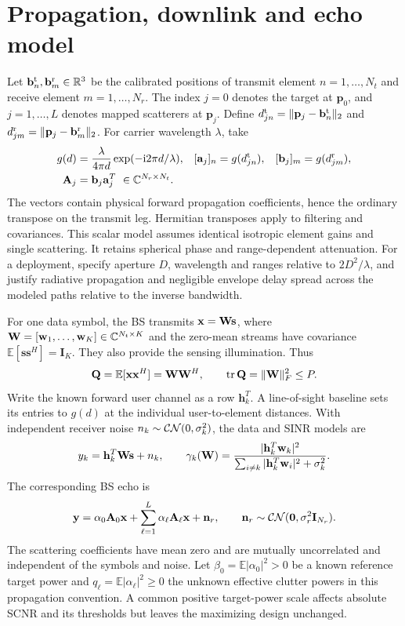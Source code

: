 \section{Propagation, downlink and echo model}
Let $\mathbf b_n^{\rm t},\mathbf b_m^{\rm r}\in\mathbb R^3$ be the calibrated positions of transmit element $n=1,\ldots,N_t$ and receive element $m=1,\ldots,N_r$. The index $j=0$ denotes the target at $\mathbf p_0$, and $j=1,\ldots,L$ denotes mapped scatterers at $\mathbf p_j$. Define $d^{\rm t}_{jn}=\|\mathbf p_j-\mathbf b_n^{\rm t}\|_2$ and $d^{\rm r}_{jm}=\|\mathbf p_j-\mathbf b_m^{\rm r}\|_2$. For carrier wavelength $\lambda$, take
\begin{align}
 g(d)&=\frac{\lambda}{4\pi d}\exp(-\mathrm{i}2\pi d/\lambda),&
 [\mathbf a_j]_n&=g(d^{\rm t}_{jn}),&
 [\mathbf b_j]_m&=g(d^{\rm r}_{jm}),\\
 \mathbf A_j&=\mathbf b_j\mathbf a_j^T\ \in\mathbb C^{N_r\times N_t}.\label{eq:response}
\end{align}
The vectors contain physical forward propagation coefficients, hence the ordinary transpose on the transmit leg. Hermitian transposes apply to filtering and covariances. This scalar model assumes identical isotropic element gains and single scattering. It retains spherical phase and range-dependent attenuation. For a deployment, specify aperture $D$, wavelength and ranges relative to $2D^2/\lambda$, and justify radiative propagation and negligible envelope delay spread across the modeled paths relative to the inverse bandwidth.

For one data symbol, the BS transmits $\mathbf x=\mathbf W\mathbf s$, where $\mathbf W=[\mathbf w_1,\ldots,\mathbf w_K]\in\mathbb C^{N_t\times K}$ and the zero-mean streams have covariance $\mathbb E[\mathbf s\mathbf s^H]=\mathbf I_K$. They also provide the sensing illumination. Thus
\begin{equation}
 \mathbf Q=\mathbb E[\mathbf x\mathbf x^H]=\mathbf W\mathbf W^H,\qquad \operatorname{tr}\mathbf Q=\|\mathbf W\|_F^2\leq P.\label{eq:power}
\end{equation}
Write the known forward user channel as a row $\mathbf h_k^T$. A line-of-sight baseline sets its entries to $g(d)$ at the individual user-to-element distances. With independent receiver noise $n_k\sim\mathcal{CN}(0,\sigma_k^2)$, the data and SINR models are
\begin{equation}
 y_k=\mathbf h_k^T\mathbf W\mathbf s+n_k,\qquad
 \gamma_k(\mathbf W)=\frac{|\mathbf h_k^T\mathbf w_k|^2}
 {\sum_{i\ne k}|\mathbf h_k^T\mathbf w_i|^2+\sigma_k^2}.\label{eq:sinr}
\end{equation}
The corresponding BS echo is
\begin{equation}
 \mathbf y=\alpha_0\mathbf A_0\mathbf x+\sum_{\ell=1}^{L}\alpha_\ell\mathbf A_\ell\mathbf x+\mathbf n_r,
 \qquad \mathbf n_r\sim\mathcal{CN}(\mathbf0,\sigma_r^2\mathbf I_{N_r}).\label{eq:echo}
\end{equation}
The scattering coefficients have mean zero and are mutually uncorrelated and independent of the symbols and noise. Let $\beta_0=\mathbb E|\alpha_0|^2>0$ be a known reference target power and $q_\ell=\mathbb E|\alpha_\ell|^2\geq0$ the unknown effective clutter powers in this propagation convention. A common positive target-power scale affects absolute SCNR and its thresholds but leaves the maximizing design unchanged.

